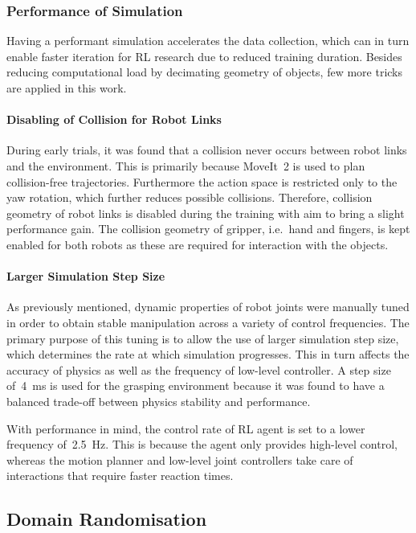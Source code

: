 \subsubsection{Performance of Simulation}

Having a performant simulation accelerates the data collection, which can in turn enable faster iteration for RL research due to reduced training duration. Besides reducing computational load by decimating geometry of objects, few more tricks are applied in this work.

\paragraph{Disabling of Collision for Robot Links} During early trials, it was found that a collision never occurs between robot links and the environment. This is primarily because MoveIt~2 is used to plan collision-free trajectories. Furthermore the action space is restricted only to the yaw rotation, which further reduces possible collisions. Therefore, collision geometry of robot links is disabled during the training with aim to bring a slight performance gain. The collision geometry of gripper, i.e.~hand and fingers, is kept enabled for both robots as these are required for interaction with the objects.

\paragraph{Larger Simulation Step Size} As previously mentioned, dynamic properties of robot joints were manually tuned in order to obtain stable manipulation across a variety of control frequencies. The primary purpose of this tuning is to allow the use of larger simulation step size, which determines the rate at which simulation progresses. This in turn affects the accuracy of physics as well as the frequency of low-level controller. A step size of~4~ms is used for the grasping environment because it was found to have a balanced trade-off between physics stability and performance.

\bigskip

With performance in mind, the control rate of RL agent is set to a lower frequency of~2.5~Hz. This is because the agent only provides high-level control, whereas the motion planner and low-level joint controllers take care of interactions that require faster reaction times.


\subsection{Domain Randomisation}\label{sec:impl_domain_randomisation}


